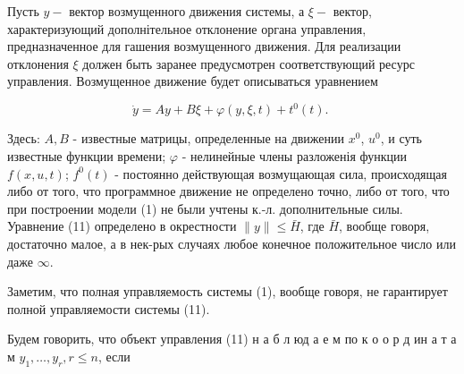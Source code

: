 \documentclass[10pt]{article}
\begin{document}
Пусть $y-$ вектор возмущенного движения системы, а $\xi-$ вектор, характеризующий дополнітельное отклонение органа управления, предназначенное для гашения возмущенного движения. Для реализации отклонения $\xi$ должен быть заранее предусмотрен соответствующий ресурс управления. Возмущенное движение будет описываться уравнением



\[

\dot{y}=A y+B \xi+\varphi(y, \xi, t)+t^{0}(t) \text {. }

\]



Здесь: $A, B$ - известные матрицы, определенные на движении $x^{0}$, $u^{0}$, и суть известные функции времени; $\varphi$ - нелинейные члены разложенія функции $f(x, u, t)$; $f^{0}(t)$ - постоянно действующая возмущающая сила, происходящая либо от того, что программное движение не определено точно, либо от того, что при построении модели (1) не были учтены к.-л. дополнительные силы. Уравнение (11) определено в окрестности $\|y\| \leqslant \bar{H}$, где $\bar{H}$, вообще говоря, достаточно малое, а в нек-рых случаях любое конечное положительное число или даже $\infty$.



Заметим, что полная управляемость системы (1), вообще говоря, не гарантирует полной управляемости системы (11).



Будем говорить, что объект управления (11) н а б л юд а е м по к о о р д ин а т а м $y_{1}, \ldots, y_{r}, r \leqslant n$, если
\end{document}
